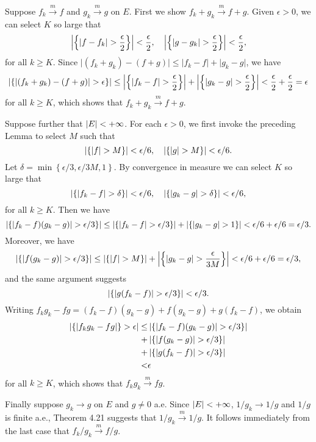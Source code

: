 \begin{exercise}{4.17}
  Suppose $f_k \xrightarrow{m} f$ and $g_k \xrightarrow{m} g$ on $E$.
  First we show $f_k + g_k \xrightarrow{m} f+g$.
  Given $\epsilon > 0$,
  we can select $K$ so large that
  \[
    \left\vert\left\{ \lvert f - f_k \rvert > \frac{\epsilon}{2} \right\}\right\vert < \frac{\epsilon}{2},
    \quad
    \left\vert\left\{ \lvert g - g_k \rvert > \frac{\epsilon}{2} \right\}\right\vert < \frac{\epsilon}{2},
  \]
  for all $k \ge K$.
  Since $\lvert (f_k + g_k) - (f+g) \rvert \le
  \lvert f_k - f \rvert + \lvert g_k - g \rvert$,
  we have
  \[
    \left\vert\left\{ \lvert (f_k + g_k) - (f+g) \rvert > \epsilon \right\}\right\vert \le
    \left\vert\left\{ \lvert f_k - f \rvert > \frac{\epsilon}{2} \right\}\right\vert
    + \left\vert\left\{ \lvert g_k - g \rvert > \frac{\epsilon}{2} \right\}\right\vert
    < \frac{\epsilon}{2} + \frac{\epsilon}{2} = \epsilon
  \]
  for all $k \ge K$, which shows that $f_k + g_k \xrightarrow{m} f + g$.

  Suppose further that $\left\vert E\right\vert < +\infty$.
  For each $\epsilon > 0$,
  we first invoke the preceding Lemma to select $M$ such that
  \[
    \left\vert\left\{ \lvert f \rvert > M \right\}\right\vert < \epsilon/6, \quad
    \left\vert\left\{ \lvert g \rvert > M \right\}\right\vert < \epsilon/6.
  \]
  Let $\delta = \min\left\{ \epsilon/3, \epsilon/3M, 1 \right\}$.
  By convergence in measure we can select $K$ so large that
  \[
    \left\vert\left\{ \lvert f_k - f \rvert > \delta \right\}\right\vert < \epsilon/6, \quad
    \left\vert\left\{ \lvert g_k - g \rvert > \delta \right\}\right\vert < \epsilon/6,
  \]
  for all $k \ge K$.
  Then we have
  \[
    \left\vert\left\{ \lvert f_k - f)(g_k - g) \rvert > \epsilon/3 \right\} \right\vert
    \le \left\vert\left\{ \lvert f_k - f \rvert > \epsilon/3 \right\}\right\vert
    + \left\vert\left\{ \lvert g_k - g \rvert > 1 \right\}\right\vert
    < \epsilon/6 + \epsilon/6 = \epsilon/3.
  \]
  Moreover, we have
  \[
    \left\vert\left\{ \lvert f (g_k - g) \rvert > \epsilon/3 \right\}\right\vert
    \le \left\vert\left\{ \lvert f \rvert > M \right\}\right\vert
    + \left\vert\left\{ \lvert g_k - g \rvert > \frac{\epsilon}{3M} \right\}\right\vert
    < \epsilon/6 + \epsilon/6 = \epsilon/3,
  \]
  and the same argument suggests
  \[
    \left\vert\left\{ \lvert g (f_k - f) \rvert > \epsilon/3 \right\}\right\vert < \epsilon/3.
  \]
  Writing $f_k g_k - fg = (f_k - f)(g_k - g) + f(g_k - g) + g(f_k - f)$,
  we obtain
  \[
    \begin{aligned}
      \left\vert\left\{ \lvert f_k g_k - fg \rvert \right\} > \epsilon\right\vert
      \le &\left\vert\left\{ \lvert f_k - f)(g_k - g) \rvert > \epsilon/3 \right\} \right\vert \\
      + &\left\vert\left\{ \lvert f (g_k - g) \rvert > \epsilon/3 \right\}\right\vert \\
      + &\left\vert\left\{ \lvert g (f_k - f) \rvert > \epsilon/3 \right\}\right\vert \\
      < &\epsilon
    \end{aligned}
  \]
  for all $k \ge K$, which shows that $f_k g_k \xrightarrow{m} fg$.

  Finally suppose $g_k \rightarrow g$ on $E$ and $g \neq 0$ a.e.
  Since $\left\vert E\right\vert < +\infty$, $1/g_k \rightarrow 1/g$ and $1/g$ is finite a.e.,
  Theorem 4.21 suggests that $1/g_k \xrightarrow{m} 1/g$.
  It follows immediately from the last case that $f_k/g_k \xrightarrow{m} f/g$.
\end{exercise}


